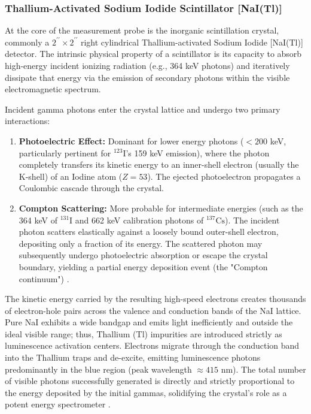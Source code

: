 \subsubsection{Thallium-Activated Sodium Iodide Scintillator [NaI(Tl)]}
At the core of the measurement probe is the inorganic scintillation crystal, commonly a $2^{\prime\prime} \times 2^{\prime\prime}$ right cylindrical Thallium-activated Sodium Iodide [NaI(Tl)] detector. The intrinsic physical property of a scintillator is its capacity to absorb high-energy incident ionizing radiation (e.g., 364 keV photons) and iteratively dissipate that energy via the emission of secondary photons within the visible electromagnetic spectrum. 
\par
Incident gamma photons enter the crystal lattice and undergo two primary interactions:
\begin{enumerate}
    \item \textbf{Photoelectric Effect:} Dominant for lower energy photons ($< 200$ keV, particularly pertinent for $^{123}\text{I}$'s 159 keV emission), where the photon completely transfers its kinetic energy to an inner-shell electron (usually the K-shell) of an Iodine atom ($Z=53$). The ejected photoelectron propagates a Coulombic cascade through the crystal.
    \item \textbf{Compton Scattering:} More probable for intermediate energies (such as the 364 keV of $^{131}\text{I}$ and 662 keV calibration photons of $^{137}\text{Cs}$). The incident photon scatters elastically against a loosely bound outer-shell electron, depositing only a fraction of its energy. The scattered photon may subsequently undergo photoelectric absorption or escape the crystal boundary, yielding a partial energy deposition event (the "Compton continuum") \cite{knoll2010radiation}.
\end{enumerate}
The kinetic energy carried by the resulting high-speed electrons creates thousands of electron-hole pairs across the valence and conduction bands of the NaI lattice. Pure NaI exhibits a wide bandgap and emits light inefficiently and outside the ideal visible range; thus, Thallium (Tl) impurities are introduced strictly as luminescence activation centers. Electrons migrate through the conduction band into the Thallium traps and de-excite, emitting luminescence photons predominantly in the blue region (peak wavelength $\approx 415$ nm). The total number of visible photons successfully generated is directly and strictly proportional to the energy deposited by the initial gammas, solidifying the crystal's role as a potent energy spectrometer \cite{cherry2012physics}.

